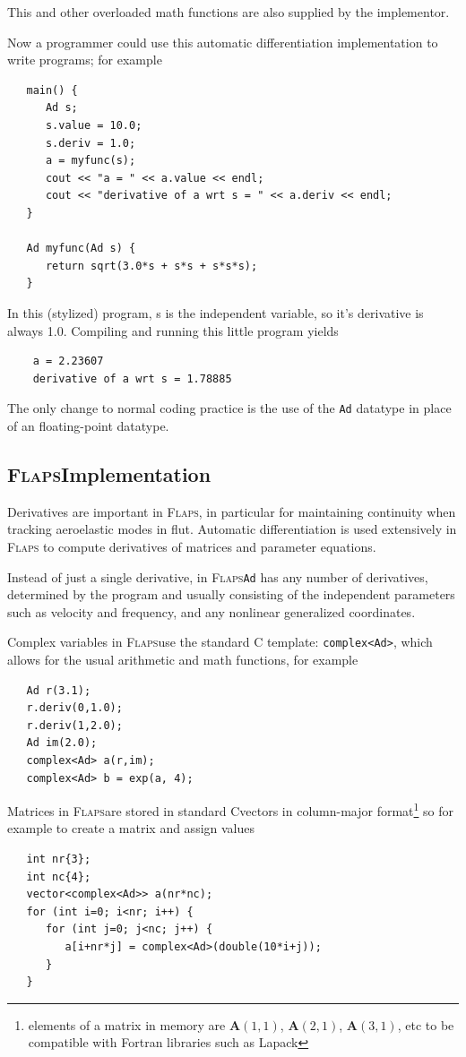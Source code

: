 \documentclass[11pt,openany,twoside]{book}
\numberwithin{equation}{section}		%
\def\Cpp{{C\nolinebreak[4]\hspace{-.05em}\raisebox{.4ex}{\tiny\bf ++}}\:}
\newcommand{\Cmd}[1]{{\sf #1}}
\newcommand{\Code}[1]{{\small\tt #1}}
\newcommand{\Flaps}{\textsc{Flaps\:}}
\newcommand{\Matrix}[1]{\boldsymbol{#1}}
\begin{document}
This and other overloaded math functions are also supplied
by the implementor.
\par
Now a programmer could use this automatic differentiation implementation
to write programs; for example
\begin{lstlisting}
   main() {
      Ad s;
      s.value = 10.0;
      s.deriv = 1.0;
      a = myfunc(s);
      cout << "a = " << a.value << endl;
      cout << "derivative of a wrt s = " << a.deriv << endl;
   }

   Ad myfunc(Ad s) {
      return sqrt(3.0*s + s*s + s*s*s);
   }
\end{lstlisting}
In this (stylized) program, s is the independent variable, so
it's derivative is always 1.0. Compiling and running this little program yields
\begin{lstlisting}
    a = 2.23607
    derivative of a wrt s = 1.78885
\end{lstlisting}
The only change to normal coding practice is the use of the
\Code{Ad} datatype in place of an floating-point datatype.

\subsection{\Flaps Implementation}
Derivatives are important in \Flaps, in particular for maintaining
continuity when tracking aeroelastic modes in \Cmd{flut}.
Automatic differentiation is used extensively in \Flaps
to compute derivatives of matrices and parameter equations.

Instead of just a single derivative, in \Flaps \Code{Ad} has
any number of derivatives, determined by the program and usually
consisting of the independent parameters such as velocity and frequency,
and any nonlinear generalized coordinates.

Complex variables in \Flaps use the standard \Cpp \Code{complex} template:
\Code{complex<Ad>}, which allows for the usual arithmetic and math functions,
for example
\begin{lstlisting}
   Ad r(3.1);
   r.deriv(0,1.0);
   r.deriv(1,2.0);
   Ad im(2.0);
   complex<Ad> a(r,im);
   complex<Ad> b = exp(a, 4);
\end{lstlisting}


Matrices in \Flaps are stored in standard \Cpp vectors in column-major
format\footnote{elements of a matrix in memory are $\Matrix{A}(1,1)$,
$\Matrix{A}(2,1)$, $\Matrix{A}(3,1)$, etc to be compatible with Fortran
libraries such as Lapack}
so for example to create a matrix and assign values
\begin{lstlisting}
   int nr{3};
   int nc{4};
   vector<complex<Ad>> a(nr*nc);
   for (int i=0; i<nr; i++) {
      for (int j=0; j<nc; j++) {
         a[i+nr*j] = complex<Ad>(double(10*i+j));
      }
   }
\end{lstlisting}
\end{document}
